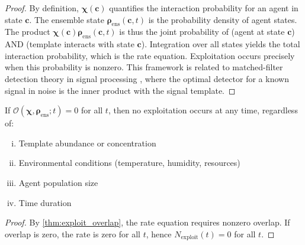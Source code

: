 \documentclass[11pt,twocolumn,a4paper]{article}
\newcommand{\Template}{\boldsymbol{\chi}}
\newcommand{\State}{\boldsymbol{\rho}}
\newcommand{\Overlap}{\mathcal{O}}
\begin{document}
\begin{proof}
By definition, $\Template(\mathbf{c})$ quantifies the interaction probability for an agent in state $\mathbf{c}$. The ensemble state $\State_{\mathrm{ens}}(\mathbf{c}, t)$ is the probability density of agent states. The product $\Template(\mathbf{c}) \State_{\mathrm{ens}}(\mathbf{c}, t)$ is thus the joint probability of (agent at state $\mathbf{c}$) AND (template interacts with state $\mathbf{c}$). Integration over all states yields the total interaction probability, which is the rate equation. Exploitation occurs precisely when this probability is nonzero. This framework is related to matched-filter detection theory in signal processing \cite{neyman1933problem}, where the optimal detector for a known signal in noise is the inner product with the signal template.
\end{proof}

\begin{corollary}
If $\Overlap(\Template, \State_{\mathrm{ens}}; t) = 0$ for all $t$, then no exploitation occurs at any time, regardless of:
\begin{enumerate}[(i)]
\item Template abundance or concentration
\item Environmental conditions (temperature, humidity, resources)
\item Agent population size
\item Time duration
\end{enumerate}
\end{corollary}

\begin{proof}
By \cref{thm:exploit_overlap}, the rate equation requires nonzero overlap. If overlap is zero, the rate is zero for all $t$, hence $N_{\mathrm{exploit}}(t) = 0$ for all $t$.
\end{proof}
\end{document}
